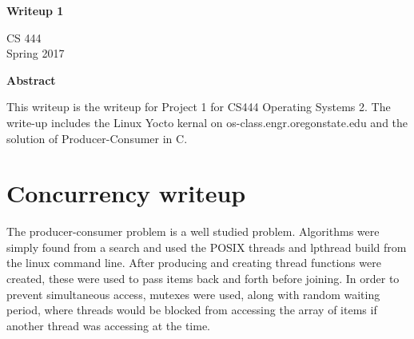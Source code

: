 \documentclass[letterpaper,10pt,titlepage]{article}
\begin{document}
\begin{titlepage}
    \begin{center}
        \vspace*{3.5cm}

        \textbf{Writeup 1}

        \vspace{0.5cm}
	
	\vspace{0.8cm}

        CS 444\\
        Spring 2017\\

        \vspace{1cm}

        \textbf{Abstract}\\

        \vspace{0.5cm}

	This writeup is the writeup for Project 1 for CS444 Operating Systems 2.  The write-up includes the Linux Yocto kernal on os-class.engr.oregonstate.edu and the solution of Producer-Consumer in C.

        \vfill

    \end{center}
\end{titlepage}

\newpage

\tableofcontents

\newpage

\section{Concurrency writeup}
The producer-consumer problem is a well studied problem.  Algorithms were simply found from a search and used the POSIX threads and lpthread build from the linux command line.  After producing and creating thread functions were created, these were used to pass items back and forth before joining.  In order to prevent simultaneous access, mutexes were used, along with random waiting period, where threads would be blocked from accessing the array of items if another thread was accessing at the time.
\end{document}
